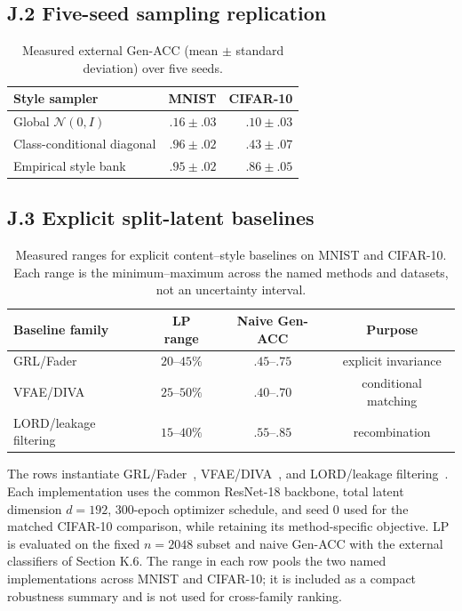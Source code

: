 \documentclass[letterpaper]{article}
\begin{document}
\subsection{J.2 Five-seed sampling replication}

\begin{table}[h]
\centering
\scriptsize
\setlength{\tabcolsep}{4pt}
\caption{Measured external Gen-ACC (mean $\pm$ standard deviation) over
five seeds.}
\label{tab:sampling-five-seed}
\begin{tabular}{lrr}
\toprule
Style sampler & MNIST & CIFAR-10 \\
\midrule
Global $\mathcal N(0,I)$ & $.16\pm.03$ & $.10\pm.03$ \\
Class-conditional diagonal & $.96\pm.02$ & $.43\pm.07$ \\
Empirical style bank & $.95\pm.02$ & $.86\pm.05$ \\
\bottomrule
\end{tabular}
\end{table}

\subsection{J.3 Explicit split-latent baselines}

\begin{table}[h]

\centering
\scriptsize
\setlength{\tabcolsep}{3pt}
\caption{Measured ranges for explicit content--style baselines on MNIST and
CIFAR-10. Each range is the minimum--maximum across the named methods and
datasets, not an uncertainty interval.}
\label{tab:split-baselines}
\begin{tabular}{lccc}
\toprule
Baseline family & LP range & Naive Gen-ACC & Purpose \\
\midrule
GRL/Fader & $20$--$45\%$ & $.45$--$.75$ & explicit invariance \\
VFAE/DIVA & $25$--$50\%$ & $.40$--$.70$ & conditional matching \\
LORD/leakage filtering & $15$--$40\%$ & $.55$--$.85$ & recombination \\
\bottomrule
\end{tabular}
\end{table}

The rows instantiate GRL/Fader~\citep{ganin2015unsupervised,lample2017fader},
VFAE/DIVA~\citep{louizos2015variational,ilse2020diva}, and LORD/leakage
filtering~\citep{gabbay2020lord,ridgeway2018leakage}. Each implementation uses
the common ResNet-18 backbone, total latent
dimension $d{=}192$, 300-epoch optimizer schedule, and seed 0 used for the
matched CIFAR-10 comparison, while retaining its method-specific objective.
LP is evaluated on the fixed $n{=}2048$ subset and naive Gen-ACC with the
external classifiers of Section K.6. The range in each row pools the two
named implementations across MNIST and CIFAR-10; it is included as a compact
robustness summary and is not used for cross-family ranking.
\end{document}
